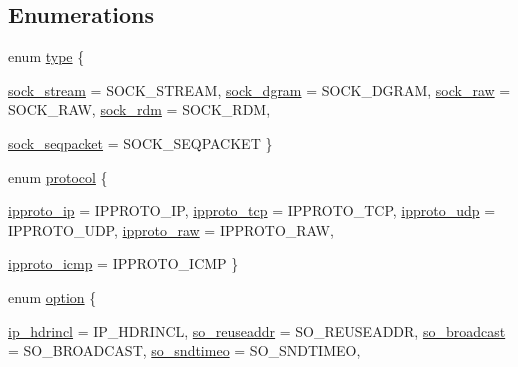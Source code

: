 \subsection*{Enumerations}
\begin{CompactItemize}
\item 
enum \hyperlink{namespacesocketpp_635f4c3b3f85aba331587404d59ae52d}{type} \{ \par
\hyperlink{namespacesocketpp_635f4c3b3f85aba331587404d59ae52de143592455509a8551e0fa943d772b4b}{sock\_\-stream} =  SOCK\_\-STREAM, 
\hyperlink{namespacesocketpp_635f4c3b3f85aba331587404d59ae52df52f36418990c9bbf4e7949e1f9ff0ee}{sock\_\-dgram} =  SOCK\_\-DGRAM, 
\hyperlink{namespacesocketpp_635f4c3b3f85aba331587404d59ae52d7b7c5341d5909dbbfcaa3fe1c04c949d}{sock\_\-raw} =  SOCK\_\-RAW, 
\hyperlink{namespacesocketpp_635f4c3b3f85aba331587404d59ae52da9b74c88a8baf194644eb089ae6457f4}{sock\_\-rdm} =  SOCK\_\-RDM, 
\par
\hyperlink{namespacesocketpp_635f4c3b3f85aba331587404d59ae52d0ae85ce0e589a95e5f14d6cdeecbbd45}{sock\_\-seqpacket} =  SOCK\_\-SEQPACKET
 \}
\item 
enum \hyperlink{namespacesocketpp_2969678def1c6c8cb4102802ca82e2cf}{protocol} \{ \par
\hyperlink{namespacesocketpp_2969678def1c6c8cb4102802ca82e2cfd8acf62568228b356df343026beade8e}{ipproto\_\-ip} =  IPPROTO\_\-IP, 
\hyperlink{namespacesocketpp_2969678def1c6c8cb4102802ca82e2cf94f358c113043dc156bb95873844546d}{ipproto\_\-tcp} =  IPPROTO\_\-TCP, 
\hyperlink{namespacesocketpp_2969678def1c6c8cb4102802ca82e2cfc2d1745e811f3d9addde50aad5e8ac9f}{ipproto\_\-udp} =  IPPROTO\_\-UDP, 
\hyperlink{namespacesocketpp_2969678def1c6c8cb4102802ca82e2cf23bb252119b970b87c8705d2d3f304a3}{ipproto\_\-raw} =  IPPROTO\_\-RAW, 
\par
\hyperlink{namespacesocketpp_2969678def1c6c8cb4102802ca82e2cfdb0258c0c773db97d6c9eac3f9485219}{ipproto\_\-icmp} =  IPPROTO\_\-ICMP
 \}
\item 
enum \hyperlink{namespacesocketpp_ea335944de1f6b81489c90507884cfc4}{option} \{ \par
\hyperlink{namespacesocketpp_ea335944de1f6b81489c90507884cfc470df783608fa9cb2b9cb450fb7027a65}{ip\_\-hdrincl} =  IP\_\-HDRINCL, 
\hyperlink{namespacesocketpp_ea335944de1f6b81489c90507884cfc4ef3c9ddad8c80879ccd993f0cbf2ddaa}{so\_\-reuseaddr} =  SO\_\-REUSEADDR, 
\hyperlink{namespacesocketpp_ea335944de1f6b81489c90507884cfc49396ae8f83e53dfde8b5d07f2e0668a3}{so\_\-broadcast} =  SO\_\-BROADCAST, 
\hyperlink{namespacesocketpp_ea335944de1f6b81489c90507884cfc45358c0a824b24bb17b03805a8fb60a52}{so\_\-sndtimeo} =  SO\_\-SNDTIMEO, 

\end{CompactItemize}
